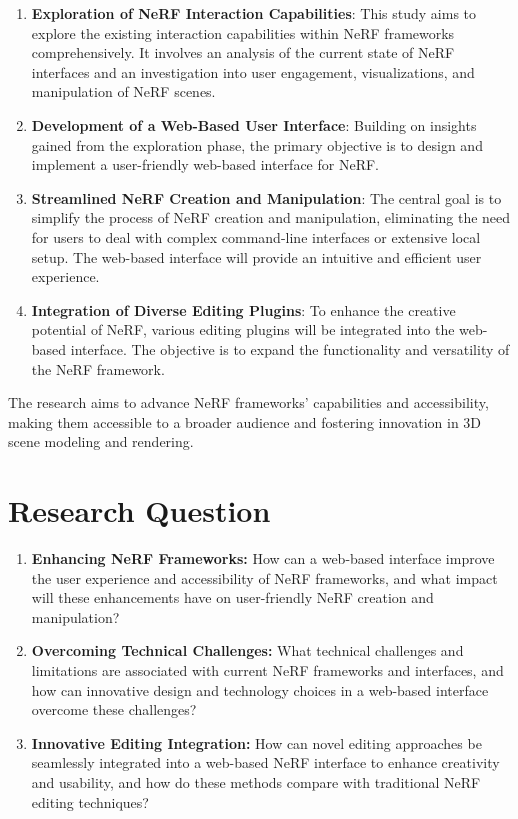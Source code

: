 \begin{enumerate}
    \item \textbf{Exploration of NeRF Interaction Capabilities}: This study aims to explore the existing interaction capabilities within NeRF frameworks comprehensively. It involves an analysis of the current state of NeRF interfaces and an investigation into user engagement, visualizations, and manipulation of NeRF scenes.

    \item \textbf{Development of a Web-Based User Interface}: Building on insights gained from the exploration phase, the primary objective is to design and implement a user-friendly web-based interface for NeRF.

    \item \textbf{Streamlined NeRF Creation and Manipulation}: The central goal is to simplify the process of NeRF creation and manipulation, eliminating the need for users to deal with complex command-line interfaces or extensive local setup. The web-based interface will provide an intuitive and efficient user experience.

    \item \textbf{Integration of Diverse Editing Plugins}: To enhance the creative potential of NeRF, various editing plugins will be integrated into the web-based interface. The objective is to expand the functionality and versatility of the NeRF framework.
\end{enumerate}

The research aims to advance NeRF frameworks' capabilities and accessibility, making them accessible to a broader audience and fostering innovation in 3D scene modeling and rendering.


\section{Research Question}
\label{sec:intro:question}

\begin{enumerate}
    \item \textbf{Enhancing NeRF Frameworks:} How can a web-based interface improve the user experience and accessibility of NeRF frameworks, and what impact will these enhancements have on user-friendly NeRF creation and manipulation?

    \item \textbf{Overcoming Technical Challenges:} What technical challenges and limitations are associated with current NeRF frameworks and interfaces, and how can innovative design and technology choices in a web-based interface overcome these challenges?

    \item \textbf{Innovative Editing Integration:} How can novel editing approaches be seamlessly integrated into a web-based NeRF interface to enhance creativity and usability, and how do these methods compare with traditional NeRF editing techniques?
\end{enumerate}


